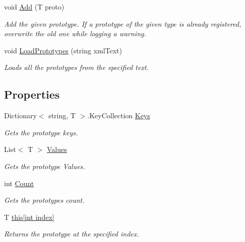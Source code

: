 \begin{DoxyCompactItemize}
void \hyperlink{class_prototype_map_aa17f775716564ba44be6b39b13b31241}{Add} (T proto)
\begin{DoxyCompactList}\small\item\em Add the given prototype. If a prototype of the given type is already registered, overwrite the old one while logging a warning. \end{DoxyCompactList}\item 
void \hyperlink{class_prototype_map_af821190bc6abb8405e6c3e94a7d929b1}{Load\+Prototypes} (string xml\+Text)
\begin{DoxyCompactList}\small\item\em Loads all the prototypes from the specified text. \end{DoxyCompactList}\end{DoxyCompactItemize}
\subsection*{Properties}
\begin{DoxyCompactItemize}
\item 
Dictionary$<$ string, T $>$.Key\+Collection \hyperlink{class_prototype_map_a87f4e8a0630815d04ce5a9db05f180ea}{Keys}
\begin{DoxyCompactList}\small\item\em Gets the prototype keys. \end{DoxyCompactList}\item 
List$<$ T $>$ \hyperlink{class_prototype_map_a8a21d043e1ab37240599a85043899959}{Values}
\begin{DoxyCompactList}\small\item\em Gets the prototype Values. \end{DoxyCompactList}\item 
int \hyperlink{class_prototype_map_a280c6ca0f386ebbfea8ae8359b657a4a}{Count}
\begin{DoxyCompactList}\small\item\em Gets the prototypes count. \end{DoxyCompactList}\item 
T \hyperlink{class_prototype_map_a6ce47f0385f9863fec002085f94c18c8}{this\mbox{[}int index\mbox{]}}
\begin{DoxyCompactList}\small\item\em Returns the prototype at the specified index. \end{DoxyCompactList}\end{DoxyCompactItemize}


